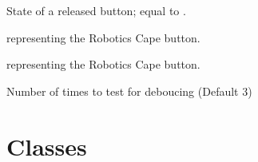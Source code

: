 \documentclass[letterpaper,10pt,english]{sphinxmanual}
\begin{document}

\begin{fulllineitems}
\label{\detokenize{index:rcpy.button.RELEASED}}
State of a released button; equal to {\hyperref[\detokenize{index:rcpy.gpio.HIGH}]{}}.

\end{fulllineitems}


\begin{fulllineitems}
\label{\detokenize{index:rcpy.button.pause}}
{\hyperref[\detokenize{index:rcpy.button.Button}]{}} representing the Robotics Cape  button.

\end{fulllineitems}


\begin{fulllineitems}
\label{\detokenize{index:rcpy.button.mode}}
{\hyperref[\detokenize{index:rcpy.button.Button}]{}} representing the Robotics Cape  button.

\end{fulllineitems}


\begin{fulllineitems}
\label{\detokenize{index:rcpy.button.DEBOUNCE}}
Number of times to test for deboucing (Default 3)

\end{fulllineitems}



\section{Classes}
\label{\detokenize{index:id4}}
\end{document}
